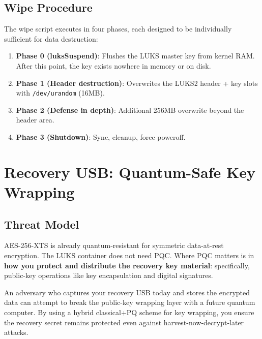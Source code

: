 \documentclass[11pt,letterpaper]{article}
\begin{document}
\subsection{Wipe Procedure}

\begin{dangerbox}
The wipe script executes in four phases, each designed to be individually sufficient for data destruction:

\begin{enumerate}
  \item \textbf{Phase 0 (luksSuspend)}: Flushes the LUKS master key from kernel RAM. After this point, the key exists nowhere in memory or on disk.
  \item \textbf{Phase 1 (Header destruction)}: Overwrites the LUKS2 header + key slots with \texttt{/dev/urandom} (16MB).
  \item \textbf{Phase 2 (Defense in depth)}: Additional 256MB overwrite beyond the header area.
  \item \textbf{Phase 3 (Shutdown)}: Sync, cleanup, force poweroff.
\end{enumerate}
\end{dangerbox}


\section{Recovery USB: Quantum-Safe Key Wrapping}

\subsection{Threat Model}

AES-256-XTS is already quantum-resistant for symmetric data-at-rest encryption. The LUKS container does not need PQC. Where PQC matters is in \textbf{how you protect and distribute the recovery key material}: specifically, public-key operations like key encapsulation and digital signatures.

\begin{securitybox}
An adversary who captures your recovery USB today and stores the encrypted data can attempt to break the public-key wrapping layer with a future quantum computer. By using a hybrid classical+PQ scheme for key wrapping, you ensure the recovery secret remains protected even against harvest-now-decrypt-later attacks.
\end{securitybox}
\end{document}
